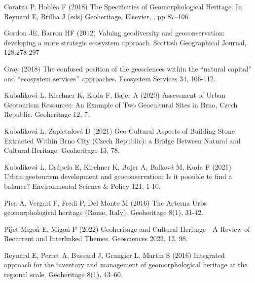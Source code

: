 {Coratza P, Hobléa F (2018) The Specificities of Geomorphological Heritage. In Reynard E, Brilha J (eds) Geoheritage, Elsevier, , pp 87–106. 

Gordon JE, Barron HF (2012) Valuing geodiversity and geoconservation: developing a more strategic ecosystem approach. Scottish Geographical Journal, 128:278-297

Gray (2018) The confused position of the geosciences within the “natural capital” and “ecosystem services” approaches. Ecosystem Services 34, 106-112. 

Kubalíková L, Kirchner K, Kuda F, Bajer A (2020) Assessment of Urban Geotourism Resources: An Example of Two Geocultural Sites in Brno, Czech Republic. Geoheritage 12, 7. 

Kubalíková L, Zapletalová D (2021) Geo-Cultural Aspects of Building Stone Extracted Within Brno City (Czech Republic): a Bridge Between Natural and Cultural Heritage. Geoheritage 13, 78. 

Kubalíková L, Drápela E, Kirchner K, Bajer A, Balková M, Kuda F (2021) Urban geotourism development and geoconservation: Is it possible to find a balance? Environmental Science \& Policy 121, 1-10. 

Pica A, Vergari F, Fredi P, Del Monte M (2016) The Aeterna Urbs geomorphological heritage (Rome, Italy). Geoheritage 8(1), 31-42. 

Pijet-Migoń E, Migoń P (2022) Geoheritage and Cultural Heritage—A Review of Recurrent and Interlinked Themes. Geosciences 2022, 12, 98. 

Reynard E, Perret A, Bussard J, Grangier L, Martin S (2016) Integrated approach for the inventory and management of geomorphological heritage at the regional scale. Geoheritage 8(1), 43–60. 
}


